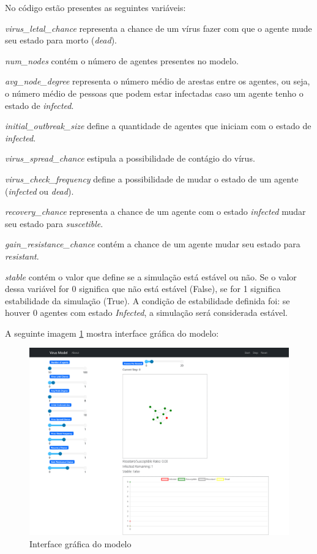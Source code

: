 No código estão presentes as seguintes variáveis:
\begin{description}
\item \textit{virus\_letal\_chance} representa a chance de um vírus fazer com que o agente mude seu estado para morto (\textit{dead}).
\item \textit{num\_nodes} contém o número de agentes presentes no modelo.
\item \textit{avg\_node\_degree} representa o número médio de arestas entre os agentes, ou seja, o número médio de pessoas que podem estar infectadas caso um agente tenho o estado de \textit{infected}.
\item \textit{initial\_outbreak\_size} define a quantidade de agentes que iniciam com o estado de \textit{infected}.
\item \textit{virus\_spread\_chance} estipula a possibilidade de contágio do vírus.
\item \textit{virus\_check\_frequency} define a possibilidade de mudar o estado de um agente (\textit{infected} ou \textit{dead}).
\item \textit{recovery\_chance} representa a chance de um agente com o estado \textit{infected} mudar seu estado para \textit{suscetible}.
\item \textit{gain\_resistance\_chance} contém a chance de um agente mudar seu estado para \textit{resistant}.
\item \textit{stable} contém o valor que define se a simulação está estável ou não. Se o valor dessa variável for 0 significa que não está estável (False), se for 1 significa estabilidade da simulação (True). A condição de estabilidade definida foi: se houver 0 agentes com estado
\textit{Infected}, a simulação será considerada estável.
\end{description}

A seguinte imagem \ref{fig:seraphritt:interface} mostra interface gráfica do modelo:
\begin{figure}[H]
    \centering
    \includegraphics[angle=0,width=1\textwidth]{exploratory-data-analysis/seraphritt/PesqBibliogr/Virus-Network/Screenshot 2023-01-20 at 13-28-40 Virus Model (Mesa visualization).png}
    \caption{Interface gráfica do modelo}
    \label{fig:seraphritt:interface}
\end{figure}

